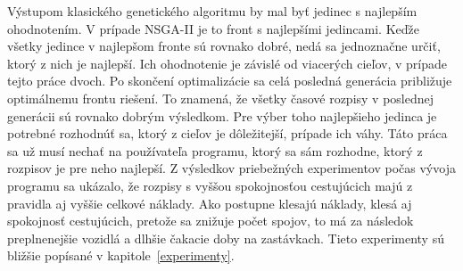 Výstupom klasického genetického algoritmu by mal byť jedinec s najlepším ohodnotením.
V prípade NSGA-II je to front s najlepšími jedincami.
Keďže všetky jedince v najlepšom fronte sú rovnako dobré, nedá sa jednoznačne určiť, ktorý z nich je najlepší.
Ich ohodnotenie je závislé od viacerých cieľov, v prípade tejto práce dvoch.
Po skončení optimalizácie sa celá posledná generácia približuje optimálnemu frontu riešení.
To znamená, že všetky časové rozpisy v poslednej generácii sú rovnako dobrým výsledkom.
Pre výber toho najlepšieho jedinca je potrebné rozhodnúť sa, ktorý z cieľov je dôležitejší, prípade ich váhy.
Táto práca sa už musí nechať na používateľa programu, ktorý sa sám rozhodne, ktorý z rozpisov je pre neho najlepší.
Z výsledkov priebežných experimentov počas vývoja programu sa ukázalo, že rozpisy s vyššou spokojnosťou cestujúcich majú z pravidla aj vyššie celkové náklady.
Ako postupne klesajú náklady, klesá aj spokojnosť cestujúcich, pretože sa znižuje počet spojov, to má za následok preplnenejšie vozidlá a dlhšie čakacie doby na zastávkach.
Tieto experimenty sú bližšie popísané v kapitole~\ref{experimenty}.

